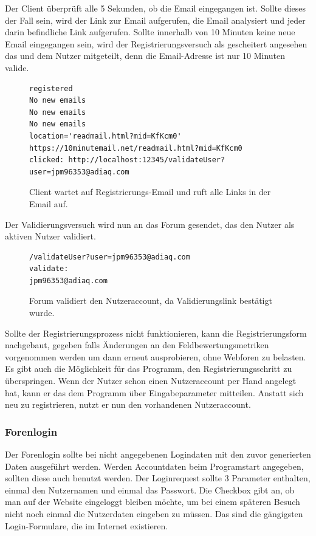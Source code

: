 Der Client überprüft alle 5 Sekunden, ob die Email eingegangen ist. Sollte dieses der Fall sein, wird der Link zur Email aufgerufen, die Email analysiert und jeder darin befindliche Link aufgerufen. Sollte innerhalb von 10 Minuten keine neue Email eingegangen sein, wird der Registrierungsversuch als gescheitert angesehen das und dem Nutzer mitgeteilt, denn die Email-Adresse ist nur 10 Minuten valide.

\begin{figure}[ht]
\begin{lstlisting}[language=HTML5]
registered
No new emails
No new emails
No new emails
location='readmail.html?mid=KfKcm0'
https://10minutemail.net/readmail.html?mid=KfKcm0
clicked: http://localhost:12345/validateUser?user=jpm96353@adiaq.com
\end{lstlisting}
\caption{Client wartet auf Registrierungs-Email und ruft alle Links in der Email auf.}
\end{figure}

Der Validierungsversuch wird nun an das Forum gesendet, das den Nutzer als aktiven Nutzer validiert.

\begin{figure}[ht]
\begin{lstlisting}[language=HTML5]
/validateUser?user=jpm96353@adiaq.com
validate:
jpm96353@adiaq.com
\end{lstlisting}
\caption{Forum validiert den Nutzeraccount, da Validierungslink bestätigt wurde.}
\end{figure}

Sollte der Registrierungsprozess nicht funktionieren, kann die Registrierungsform nachgebaut, gegeben falls Änderungen an den Feldbewertungsmetriken vorgenommen werden um dann erneut ausprobieren, ohne Webforen zu belasten. Es gibt auch die Möglichkeit für das Programm, den Registrierungsschritt zu überspringen. Wenn der Nutzer schon einen Nutzeraccount per Hand angelegt hat, kann er das dem Programm über Eingabeparameter mitteilen. Anstatt sich neu zu registrieren, nutzt er nun den vorhandenen Nutzeraccount.

\subsubsection{Forenlogin}
Der Forenlogin sollte bei nicht angegebenen Logindaten mit den zuvor generierten Daten ausgeführt werden. Werden Accountdaten beim Programstart angegeben, sollten diese auch benutzt werden. Der Loginrequest sollte 3 Parameter enthalten, einmal den Nutzernamen und einmal das Passwort. Die Checkbox gibt an, ob man auf der Website eingeloggt bleiben möchte, um bei einem späteren Besuch nicht noch einmal die Nutzerdaten eingeben zu müssen. Das sind die gängigsten Login-Formulare, die im Internet existieren.


